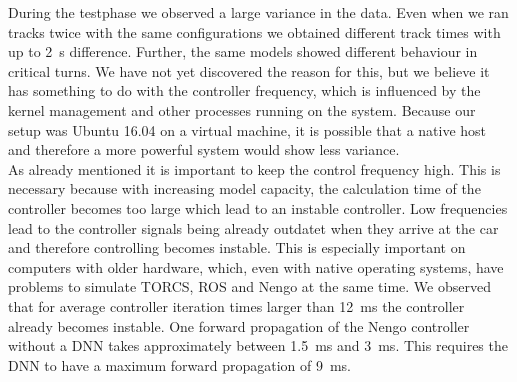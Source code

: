 \documentclass[10pt,a4paper,twoside,journal]{IEEEtran}
\begin{document}
During the testphase we observed a large variance in the data. Even when we ran tracks twice with the same configurations we obtained different track times with up to \SI{2}{\second} difference. Further, the same models showed different behaviour in critical turns. We have not yet discovered the reason for this, but we believe it has something to do with the controller frequency, which is influenced by the kernel management and other processes running on the system. Because our setup was Ubuntu 16.04 on a virtual machine, it is possible that a native host and therefore a more powerful system would show less variance. \\
%
%
As already mentioned it is important to keep the control frequency high. This is necessary because with increasing model capacity, the calculation time of the controller becomes too large which lead to an instable controller. Low frequencies lead to the controller signals being already outdatet when they arrive at the car and therefore controlling becomes instable. This is especially important on computers with older hardware, which, even with native operating systems, have problems to simulate TORCS, ROS and Nengo at the same time. We observed that for average controller iteration times larger than \SI{12}{\milli\second} the controller already becomes instable. One forward propagation of the Nengo controller without a DNN takes approximately between \SI{1.5}{\milli\second} and \SI{3}{\milli\second}. This requires the DNN to have a maximum forward propagation of \SI{9}{\milli\second}. \\
\end{document}
